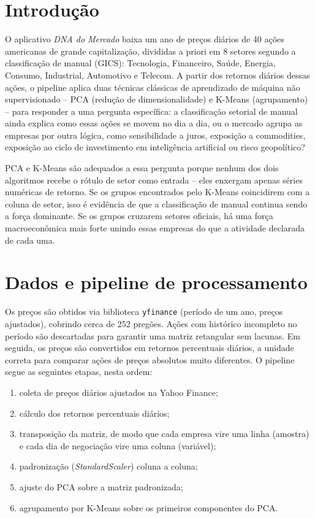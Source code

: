\documentclass[12pt,oneside,a4paper,brazil,sumario=tradicional]{abntex2}
\begin{document}
\section{Introdução}

O aplicativo \emph{DNA do Mercado} baixa um ano de preços diários de 40 ações
americanas de grande capitalização, divididas a priori em 8 setores segundo a
classificação de manual (GICS): Tecnologia, Financeiro, Saúde, Energia, Consumo,
Industrial, Automotivo e Telecom. A partir dos retornos diários dessas ações, o
pipeline aplica duas técnicas clássicas de aprendizado de máquina não
supervisionado -- PCA (redução de dimensionalidade) e K-Means (agrupamento) --
para responder a uma pergunta específica: a classificação setorial de manual
ainda explica como essas ações se movem no dia a dia, ou o mercado agrupa as
empresas por outra lógica, como sensibilidade a juros, exposição a commodities,
exposição ao ciclo de investimento em inteligência artificial ou risco
geopolítico?

PCA e K-Means são adequados a essa pergunta porque nenhum dos dois algoritmos
recebe o rótulo de setor como entrada -- eles enxergam apenas séries numéricas de
retorno. Se os grupos encontrados pelo K-Means coincidirem com a coluna de setor,
isso é evidência de que a classificação de manual continua sendo a força
dominante. Se os grupos cruzarem setores oficiais, há uma força macroeconômica
mais forte unindo essas empresas do que a atividade declarada de cada uma.

\section{Dados e pipeline de processamento}

Os preços são obtidos via biblioteca \texttt{yfinance} (período de um ano,
preços ajustados), cobrindo cerca de 252 pregões. Ações com histórico incompleto
no período são descartadas para garantir uma matriz retangular sem lacunas. Em
seguida, os preços são convertidos em retornos percentuais diários, a unidade
correta para comparar ações de preços absolutos muito diferentes. O pipeline
segue as seguintes etapas, nesta ordem:

\begin{enumerate}
  \item coleta de preços diários ajustados na Yahoo Finance;
  \item cálculo dos retornos percentuais diários;
  \item transposição da matriz, de modo que cada empresa vire uma linha (amostra)
        e cada dia de negociação vire uma coluna (variável);
  \item padronização (\emph{StandardScaler}) coluna a coluna;
  \item ajuste do PCA sobre a matriz padronizada;
  \item agrupamento por K-Means sobre os primeiros componentes do PCA.
\end{enumerate}
\end{document}
